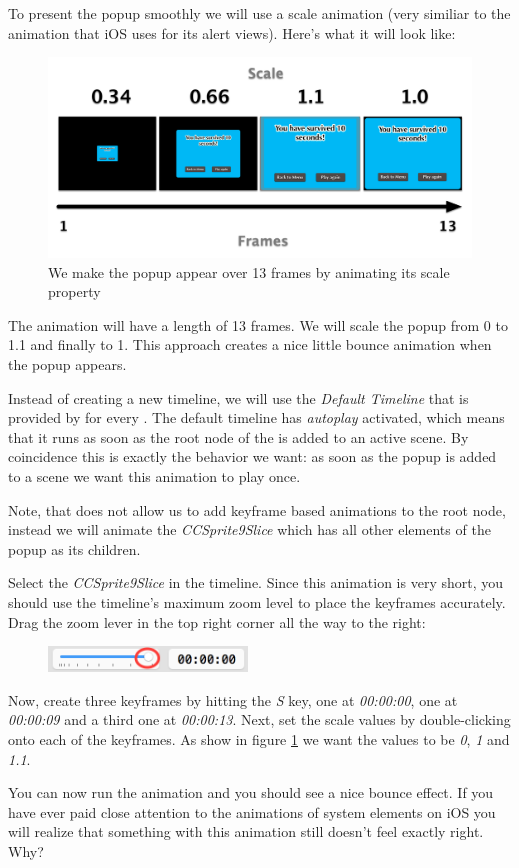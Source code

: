 To present the popup smoothly we will use a scale animation (very similiar to
the animation that iOS uses for its alert views). Here's what it will look like:

\begin{figure}[H]
    \centering
    \includegraphics[width=0.75\linewidth]{images/Chapter7/popup_animation.png}
    \caption{We make the popup appear over 13 frames by animating its scale
    property}\label{fig: animate_gamover_popup}
\end{figure}

The animation will have a length of 13 frames. We will scale the popup from 0
to 1.1 and finally to 1. This approach creates a nice little bounce animation
when the popup appears.

Instead of creating a new timeline, we will use the \textit{Default Timeline}
that is provided by \SB{} for every \ccbfile{}. The default timeline has
\textit{autoplay} activated, which means that it runs as soon as the root node
of the \ccbfile{} is added to an active scene. By coincidence this is exactly
the behavior we want: as soon as the popup is added to a scene we want this
animation to play once.

Note, that \SB{} does not allow us to add keyframe based animations to the root
node, instead we will animate the \textit{CCSprite9Slice} which has all other
elements of the popup as its children.

\begin{leftbar}
Select the \textit{CCSprite9Slice} in the timeline. Since this animation is very
short, you should use the timeline's maximum zoom level to place the keyframes
accurately. Drag the zoom lever in the top right corner all the way to the
right:
\begin{figure}[H]
    \centering
    \includegraphics[width=150pt]{images/Chapter7/timeline_zoom.png}
\end{figure}
Now, create three keyframes by hitting the \textit{S} key, one at
\textit{00:00:00}, one at \textit{00:00:09} and a third one at
\textit{00:00:13}. Next, set the scale values by double-clicking onto each of
the keyframes. As show in figure \ref{fig: animate_gamover_popup} we want the
values to be \textit{0}, \textit{1} and \textit{1.1}.
\end{leftbar}
You can now run the animation and you should see a nice bounce effect. If you
have ever paid close attention to the animations of system elements on iOS you
will realize that something with this animation still doesn't feel exactly
right. Why?

